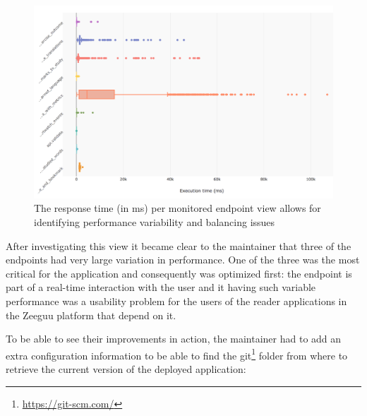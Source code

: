 \documentclass[conference]{IEEEtran}
\begin{document}

  \begin{figure}[!ht]
    \centering
    \includegraphics[width=0.9\linewidth]{endpoint_performance.png}
    \caption{The response time (in ms) per monitored endpoint view allows for identifying performance variability and balancing issues}
    \label{fig:ep}
  \end{figure}

  After investigating this view it became clear to the maintainer that three of the endpoints had very large variation in performance. One of the three was the most critical for the application and consequently was optimized first: the \epTranslations endpoint is part of a real-time interaction with the user and it having such variable performance was a usability problem for the users of the reader applications in the Zeeguu platform that depend on it. 



  \niceseparator

  To be able to see their improvements in action, the maintainer had to add an extra configuration information to be able to find the git\footnote{\url{https://git-scm.com/}} folder from where to retrieve the current version of the deployed application: 
\end{document}
